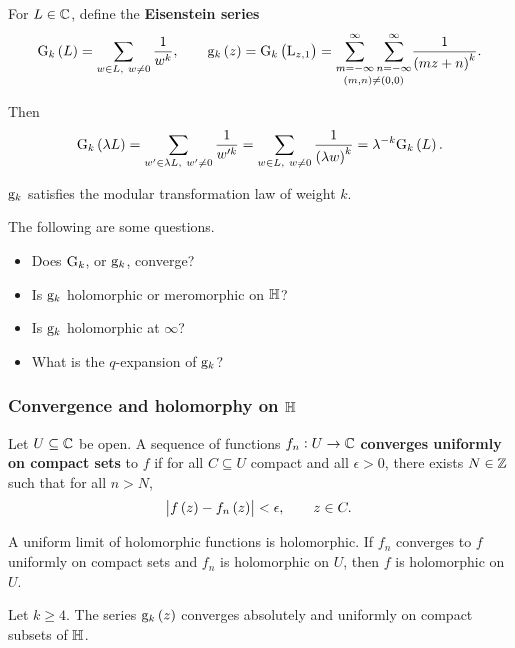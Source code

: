 
\begin{definition}
For $ L \in \mathbb{C} $, define the \textbf{Eisenstein series}
$$ \G_k\br{L} = \sum_{w \in L, \ w \ne 0} \dfrac{1}{w^k}, \qquad \g_k\br{z} = \G_k\br{\L_{z, 1}} = \underset{\br{m, n} \ne \br{0, 0}}{\sum_{m = -\infty}^\infty \sum_{n = -\infty}^\infty} \dfrac{1}{\br{mz + n}^k}. $$
\end{definition}

Then
$$ \G_k\br{\lambda L} = \sum_{w' \in \lambda L, \ w' \ne 0} \dfrac{1}{w'^k} = \sum_{w \in L, \ w \ne 0} \dfrac{1}{\br{\lambda w}^k} = \lambda^{-k}\G_k\br{L}. $$

\begin{corollary}
$ \mathrm{g}_k $ satisfies the modular transformation law of weight $ k $.
\end{corollary}

The following are some questions.
\begin{itemize}
\item Does $ \mathrm{G}_k $, or $ \mathrm{g}_k $, converge?
\item Is $ \mathrm{g}_k $ holomorphic or meromorphic on $ \mathbb{H} $?
\item Is $ \mathrm{g}_k $ holomorphic at $ \infty $?
\item What is the $ q $-expansion of $ \mathrm{g}_k $?
\end{itemize}

\subsubsection{Convergence and holomorphy on \texorpdfstring{$ \mathbb{H} $}{H}}

\begin{definition}
Let $ U \subseteq \mathbb{C} $ be open. A sequence of functions $ f_n : U \to \mathbb{C} $ \textbf{converges uniformly on compact sets} to $ f $ if for all $ C \subseteq U $ compact and all $ \epsilon > 0 $, there exists $ N \in \mathbb{Z} $ such that for all $ n > N $,
$$ \abs{f\br{z} - f_n\br{z}} < \epsilon, \qquad z \in C. $$
\end{definition}

\begin{theorem}
A uniform limit of holomorphic functions is holomorphic. If $ f_n $ converges to $ f $ uniformly on compact sets and $ f_n $ is holomorphic on $ U $, then $ f $ is holomorphic on $ U $.
\end{theorem}

\begin{theorem}
Let $ k \ge 4 $. The series $ \g_k\br{z} $ converges absolutely and uniformly on compact subsets of $ \mathbb{H} $.
\end{theorem}

